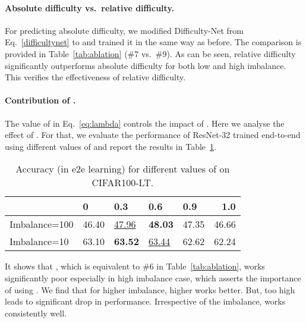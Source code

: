 \documentclass[10pt,twocolumn,letterpaper]{article}
\begin{document}
\paragraph{\bf Absolute difficulty vs.~relative difficulty.} 
For predicting absolute difficulty, we modified Difficulty-Net from Eq.~\ref{difficultynet} to  and trained it in the same way as before. 
The comparison is provided in Table~\ref{tab:ablation} (\#7 vs.~\#9).
As can be seen, relative difficulty significantly outperforms absolute difficulty for both low and high imbalance. 
This verifies the effectiveness of relative difficulty. 




\paragraph{\bf Contribution of .} 
The value of  in Eq.~\ref{eq:lambda} controls the impact of . 
Here we analyse the effect of .
For that, we evaluate the performance of ResNet-32 trained end-to-end using different values of  and report the results in Table~\ref{tab:analysis for diff imbalance}.
\begin{table}
  \begin{center}
    {\small{
    \begin{tabular}{lllllr}
\toprule
     & 0 & 0.3  & 0.6  & 0.9  & 1.0 \\
    \midrule
    Imbalance=100 & 46.40 & \underline{47.96} & \textbf{48.03} & 47.35 & 46.66\\
    Imbalance=10 & 63.10 & \textbf{63.52} & \underline{63.44} & 62.62 & 62.24\\
     \bottomrule

\end{tabular}
}}
\end{center}
\caption{Accuracy (in e2e learning) for different values of  on CIFAR100-LT.  }
  \label{tab:analysis for diff imbalance}
\end{table}
It shows that , which is equivalent to \#6 in Table~\ref{tab:ablation}, works significantly poor especially in high imbalance case, which asserts the importance of using . We find that for higher imbalance, higher  works better. 
But, too high  leads to significant drop in performance.
Irrespective of  the imbalance,  works consistently well.
\end{document}
